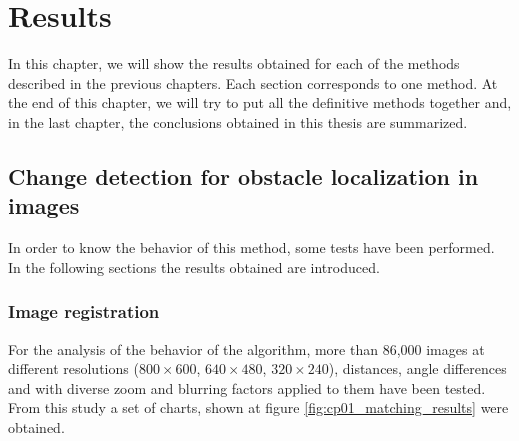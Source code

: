

\chapter{Results}\label{ch:chapter08}

In this chapter, we will show the results obtained for each of the methods described in the previous chapters. Each section corresponds to one method. At the end of this chapter, we will try to put all the definitive methods together and, in the last chapter, the conclusions obtained in this thesis are summarized.

\graphicspath{{./images/chapter01/bmps/}{./images/chapter01/vects/}{./images/chapter01/}}
\section{Change detection for obstacle localization in images}\label{ch:chapter01_02}

In order to know the behavior of this method, some tests have been performed. In the following sections the results obtained are introduced.

\subsection{Image registration}\label{ch:chapter01_02_01}

For the analysis of the behavior of the algorithm, more than 86,000 images at different resolutions ($800 \times 600$, $640 \times 480$, $320 \times 240$), distances, angle differences and with diverse zoom and blurring factors applied to them have been tested. From this study a set of charts, shown at figure \ref{fig:cp01_matching_results} were obtained.

